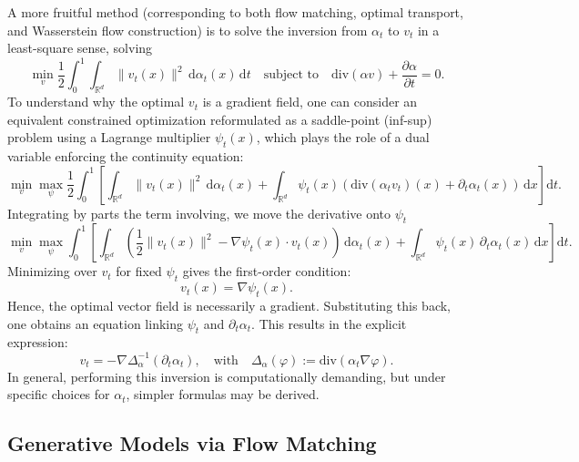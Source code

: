 A more fruitful method (corresponding to both flow matching, optimal transport, and Wasserstein flow construction) is to solve the inversion from \(\alpha_t\) to \(v_t\) in a least-square sense, solving
\begin{equation}\label{eq:least-square-field}
	\min_v \frac{1}{2}\int_0^1 \int_{\mathbb{R}^d} \|v_t(x)\|^2 \, \mathrm{d}\alpha_t(x) \, \mathrm{d}t \quad \text{subject to} \quad \text{div}(\alpha v) + \frac{\partial \alpha}{\partial t} = 0.
\end{equation}
To understand why the optimal \(v_t\) is a gradient field, one can consider an equivalent constrained optimization reformulated as a saddle-point (inf-sup) problem using a Lagrange multiplier \(\psi_t(x)\), which plays the role of a dual variable enforcing the continuity equation:
\begin{equation}
\min_v \max_{\psi} \frac{1}{2} \int_0^1 \left[ \int_{\mathbb{R}^d} \|v_t(x)\|^2 \, \mathrm{d}\alpha_t(x) + \int_{\mathbb{R}^d} \psi_t(x)\left(\text{div}(\alpha_t v_t)(x) + \partial_t \alpha_t(x)\right) \, \mathrm{d}x \right] \mathrm{d}t.
\end{equation}
Integrating by parts the term involving, we move the derivative onto \(\psi_t\)
\begin{equation}
\min_v \max_{\psi} \int_0^1 \left[ \int_{\mathbb{R}^d} \left( \frac{1}{2} \|v_t(x)\|^2 - \nabla \psi_t(x) \cdot v_t(x)\right) \, \mathrm{d}\alpha_t(x) + \int_{\mathbb{R}^d} \psi_t(x) \, \partial_t \alpha_t(x) \, \mathrm{d}x \right] \mathrm{d}t.
\end{equation}
Minimizing over \(v_t\) for fixed \(\psi_t\) gives the first-order condition:
\begin{equation}
	v_t(x) = \nabla \psi_t(x).
\end{equation}
Hence, the optimal vector field is necessarily a gradient. Substituting this back, one obtains an equation linking \(\psi_t\) and \(\partial_t \alpha_t\). This results in the explicit expression:
\begin{equation}\label{eq:least-square-field-explicit}
    v_t = -  \nabla \Delta_\alpha^{-1}(\partial_t \alpha_t), \quad \text{with} \quad \Delta_\alpha(\varphi) := \mathrm{div}(\alpha_t \nabla \varphi).
\end{equation}
In general, performing this inversion is computationally demanding, but under specific choices for \(\alpha_t\), simpler formulas may be derived.


\subsection{Generative Models via Flow Matching}

